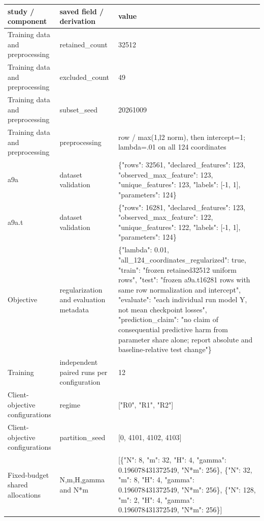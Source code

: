 \begin{tabular}{lll}
study / component & saved field / derivation & value \\
\hline
Training data and preprocessing & retained\_count & 32512 \\
Training data and preprocessing & excluded\_count & 49 \\
Training data and preprocessing & subset\_seed & 20261009 \\
Training data and preprocessing & preprocessing & row / max(1,l2 norm), then intercept=1; lambda=.01 on all 124 coordinates \\
a9a & dataset validation & \{"rows": 32561, "declared\_features": 123, "observed\_max\_feature": 123, "unique\_features": 123, "labels": [-1, 1], "parameters": 124\} \\
a9a.t & dataset validation & \{"rows": 16281, "declared\_features": 123, "observed\_max\_feature": 122, "unique\_features": 122, "labels": [-1, 1], "parameters": 124\} \\
Objective & regularization and evaluation metadata & \{"lambda": 0.01, "all\_124\_coordinates\_regularized": true, "train": "frozen retained32512 uniform rows", "test": "frozen a9a.t16281 rows with same row normalization and intercept", "evaluate": "each individual run model Y, not mean checkpoint losses", "prediction\_claim": "no claim of consequential predictive harm from parameter share alone; report absolute and baseline-relative test change"\} \\
Training & independent paired runs per configuration & 12 \\
Client-objective configurations & regime & ["R0", "R1", "R2"] \\
Client-objective configurations & partition\_seed & [0, 4101, 4102, 4103] \\
Fixed-budget shared allocations & N,m,H,gamma and N*m & [\{"N": 8, "m": 32, "H": 4, "gamma": 0.196078431372549, "N*m": 256\}, \{"N": 32, "m": 8, "H": 4, "gamma": 0.196078431372549, "N*m": 256\}, \{"N": 128, "m": 2, "H": 4, "gamma": 0.196078431372549, "N*m": 256\}] \\

\end{tabular}
